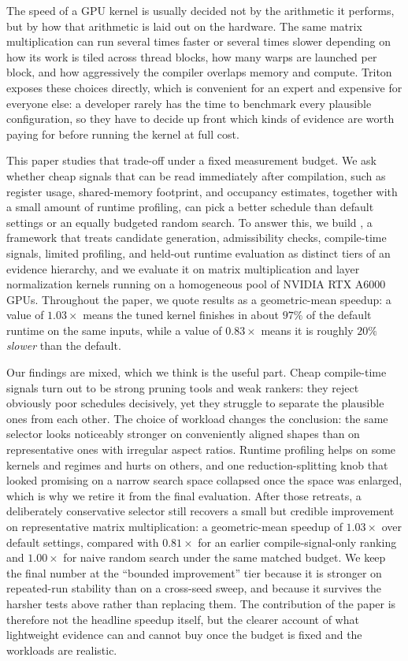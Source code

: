The speed of a GPU kernel is usually decided not by the arithmetic it performs, but by how that arithmetic is laid out on the hardware. The same matrix multiplication can run several times faster or several times slower depending on how its work is tiled across thread blocks, how many warps are launched per block, and how aggressively the compiler overlaps memory and compute. Triton exposes these choices directly, which is convenient for an expert and expensive for everyone else: a developer rarely has the time to benchmark every plausible configuration, so they have to decide up front which kinds of evidence are worth paying for before running the kernel at full cost.

This paper studies that trade-off under a fixed measurement budget. We ask whether cheap signals that can be read immediately after compilation, such as register usage, shared-memory footprint, and occupancy estimates, together with a small amount of runtime profiling, can pick a better schedule than default settings or an equally budgeted random search. To answer this, we build \system, a framework that treats candidate generation, admissibility checks, compile-time signals, limited profiling, and held-out runtime evaluation as distinct tiers of an evidence hierarchy, and we evaluate it on matrix multiplication and layer normalization kernels running on a homogeneous pool of NVIDIA RTX A6000 GPUs. Throughout the paper, we quote results as a geometric-mean speedup: a value of $1.03\times$ means the tuned kernel finishes in about $97\%$ of the default runtime on the same inputs, while a value of $0.83\times$ means it is roughly $20\%$ \emph{slower} than the default.

Our findings are mixed, which we think is the useful part. Cheap compile-time signals turn out to be strong pruning tools and weak rankers: they reject obviously poor schedules decisively, yet they struggle to separate the plausible ones from each other. The choice of workload changes the conclusion: the same selector looks noticeably stronger on conveniently aligned shapes than on representative ones with irregular aspect ratios. Runtime profiling helps on some kernels and regimes and hurts on others, and one reduction-splitting knob that looked promising on a narrow search space collapsed once the space was enlarged, which is why we retire it from the final evaluation. After those retreats, a deliberately conservative selector still recovers a small but credible improvement on representative matrix multiplication: a geometric-mean speedup of $1.03\times$ over default settings, compared with $0.81\times$ for an earlier compile-signal-only ranking and $1.00\times$ for naive random search under the same matched budget. We keep the final number at the ``bounded improvement'' tier because it is stronger on repeated-run stability than on a cross-seed sweep, and because it survives the harsher tests above rather than replacing them. The contribution of the paper is therefore not the headline speedup itself, but the clearer account of what lightweight evidence can and cannot buy once the budget is fixed and the workloads are realistic.
